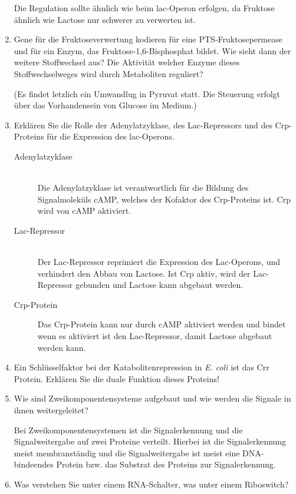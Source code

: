\begin{enumerate}
		Die Regulation sollte ähnlich wie beim lac-Operon erfolgen,
		da Fruktose ähnlich wie Lactose nur schwerer zu verwerten ist.

	\item Gene für die Fruktoseverwertung kodieren für eine PTS-Fruktosepermease und für ein Enzym, das Fruktose-1,6-Bisphosphat bildet. Wie sieht dann der weitere Stoffwechsel aus? Die Aktivität welcher Enzyme dieses Stoffwechselweges wird durch Metaboliten reguliert?

		(Es findet letzlich ein Umwandlug in Pyruvat statt.
		Die Steuerung erfolgt über das Vorhandensein von Glucose im Medium.)

	\item Erklären Sie die Rolle der Adenylatzyklase, des Lac-Repressors und des Crp-Proteins für die Expression des lac-Operons.

		\begin{description}
			\item[Adenylatzyklase] \hfill \\
				Die Adenylatzyklase ist verantwortlich für die Bildung des Signalmoleküls cAMP,
				welches der Kofaktor des Crp-Proteins ist.
				Crp wird von cAMP aktiviert.
			\item[Lac-Repressor] \hfill \\
				Der Lac-Repressor reprimiert die Expression des Lac-Operons,
				und verhindert den Abbau von Lactose.
				Ist Crp aktiv, wird der Lac-Repressor gebunden
				und Lactose kann abgebaut werden.
			\item[Crp-Protein] \hfill 
				Das Crp-Protein kann nur durch cAMP aktiviert werden 
				und bindet wenn es aktiviert ist den Lac-Repressor,
				damit Lactose abgebaut werden kann.
		\end{description}

	\item Ein Schlüsselfaktor bei der Katabolitenrepression in \emph{E. coli} ist das Crr Protein. Erklären Sie die duale Funktion dieses Proteins!	
	\item Wie sind Zweikomponentensysteme aufgebaut und wie werden die Signale in ihnen weitergeleitet?

		Bei Zweikomponentensystemen ist die Signalerkennung und die Signalweitergabe auf zwei Proteine verteilt.
		Hierbei ist die Signalerkennung meist membranständig und die Signalweitergabe ist meist eine DNA-bindeendes Protein
		bzw. das Substrat des Proteins zur Signalerkennung.

	\item Was verstehen Sie unter einem RNA-Schalter, was unter einem Riboswitch?


\end{enumerate}
